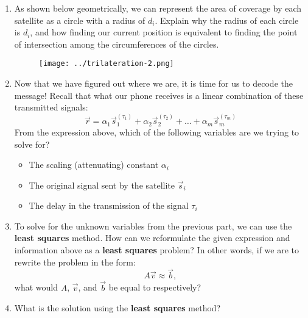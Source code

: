 \begin{enumerate}
    \item As shown below geometrically, we can represent the area of coverage by each satellite as a circle with a radius of $d_i$. Explain why the radius of each circle is $d_i$, and how finding our current position is equivalent to finding the point of intersection among the circumferences of the circles.
    \begin{figure}[H]
        \centering
        \texttt{[image: ../trilateration-2.png]}
    \end{figure}

    \noindent\fbox{
        \parbox{16cm}{
            \hspace{16cm}
            \vspace{4cm}
        }
    }

    \item Now that we have figured out where we are, it is time for us to decode the message! Recall that what our phone receives is a linear combination of these transmitted signals:
    $$\vec{r} = \alpha_1 \vec{s}_1^{(\tau_1)} + \alpha_2 \vec{s}_2^{(\tau_2)} + \hdots + \alpha_m \vec{s}_m^{(\tau_m)}$$
    From the expression above, which of the following variables are we trying to solve for?
    \begin{itemize}
        \item The scaling (attenuating) constant $\alpha_i$
        \item The original signal sent by the satellite $\vec{s}_i$
        \item The delay in the transmission of the signal $\tau_i$
    \end{itemize}

    \noindent\fbox{
        \parbox{16cm}{
            \hspace{16cm}
            \vspace{3cm}
        }
    }
    \newpage
    \item To solve for the unknown variables from the previous part, we can use the \textbf{least squares} method. How can we reformulate the given expression and information above as a \textbf{least squares} problem? In other words, if we are to rewrite the problem in the form:
    $$A\vec{v} \approx \vec{b},$$
    what would $A$, $\vec{v}$, and $\vec{b}$ be equal to respectively?
    
    \noindent\fbox{
        \parbox{16cm}{
            \hspace{16cm}
            \vspace{4cm}
        }
    }
    \item What is the solution using the \textbf{least squares} method?
    

\end{enumerate}

